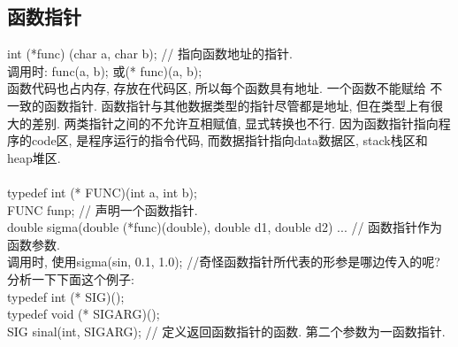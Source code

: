 \documentclass[a4paper,10pt,english]{article}
\begin{document}
\subsection {函数指针}
int (*func) (char a, char b); // 指向函数地址的指针. \\
调用时: func(a, b); 或(* func)(a, b);\\
函数代码也占内存, 存放在代码区, 所以每个函数具有地址. 一个函数不能赋给 不一致的函数指针. 函数指针与其他数据类型的指针尽管都是地址, 但在类型上有很大的差别. 两类指针之间的不允许互相赋值, 显式转换也不行. 因为函数指针指向程序的code区, 是程序运行的指令代码, 而数据指针指向data数据区, stack栈区和heap堆区. \\\\
typedef int (* FUNC)(int a, int b); \\
FUNC funp; // 声明一个函数指针. \\
double sigma(double (*func)(double), double d1, double d2) {...} // 函数指针作为函数参数. \\
调用时, 使用sigma(sin, 0.1, 1.0); //奇怪函数指针所代表的形参是哪边传入的呢? \\

分析一下下面这个例子: \\
typedef int (* SIG)(); \\
typedef void (* SIGARG)();\\
SIG sinal(int, SIGARG); // 定义返回函数指针的函数. 第二个参数为一函数指针.
\end{document}
